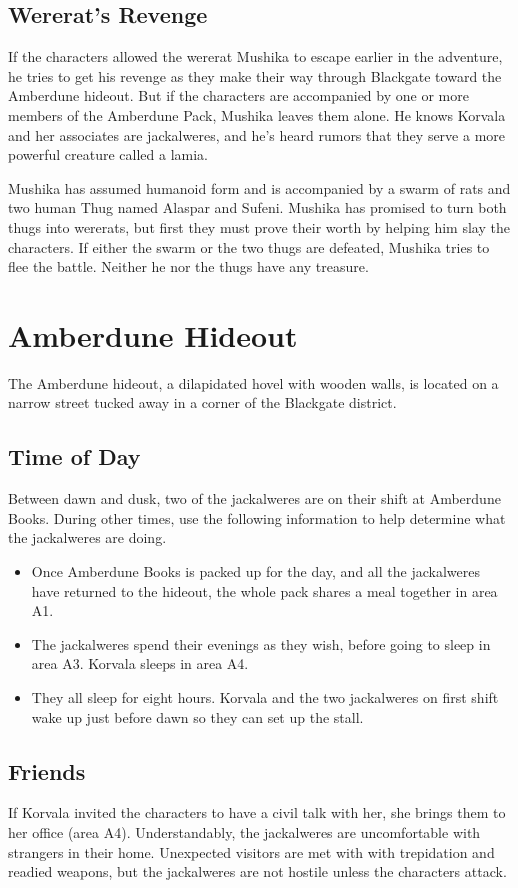 \documentclass[10pt,a4paper,twoside,bg=print,twocolumn,openany,nodeprecatedcode]{dndbook}
\begin{document}
\subsection{Wererat's Revenge}
If the characters allowed the wererat Mushika to escape earlier in the adventure, he tries to get his revenge as they make their way through Blackgate toward the Amberdune hideout. But if the characters are accompanied by one or more members of the Amberdune Pack, Mushika leaves them alone. He knows Korvala and her associates are jackalweres, and he's heard rumors that they serve a more powerful creature called a lamia.

Mushika has assumed humanoid form and is accompanied by a swarm of rats and two human Thug named Alaspar and Sufeni. Mushika has promised to turn both thugs into wererats, but first they must prove their worth by helping him slay the characters. If either the swarm or the two thugs are defeated, Mushika tries to flee the battle. Neither he nor the thugs have any treasure.

\section{Amberdune Hideout}
The Amberdune hideout, a dilapidated hovel with wooden walls, is located on a narrow street tucked away in a corner of the Blackgate district.

\subsection{Time of Day}
Between dawn and dusk, two of the jackalweres are on their shift at Amberdune Books. During other times, use the following information to help determine what the jackalweres are doing.


\begin{itemize}
\item Once Amberdune Books is packed up for the day, and all the jackalweres have returned to the hideout, the whole pack shares a meal together in area A1.
\item The jackalweres spend their evenings as they wish, before going to sleep in area A3. Korvala sleeps in area A4.
\item They all sleep for eight hours. Korvala and the two jackalweres on first shift wake up just before dawn so they can set up the stall.
\end{itemize}

\subsection{Friends}
If Korvala invited the characters to have a civil talk with her, she brings them to her office (area A4). Understandably, the jackalweres are uncomfortable with strangers in their home. Unexpected visitors are met with with trepidation and readied weapons, but the jackalweres are not hostile unless the characters attack.
\end{document}
